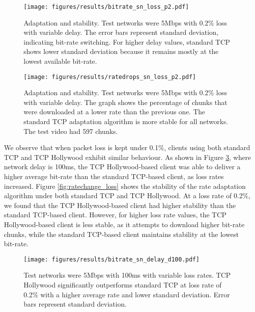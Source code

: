 \begin{figure}
  \centering
  \texttt{[image: figures/results/bitrate\_sn\_loss\_p2.pdf]}
  \caption{Adaptation and stability. Test networks were 5Mbps with 0.2\% loss with variable 
           delay. The error bars represent standard deviation, indicating bit-rate switching. For higher delay values, 
           standard TCP shows lower standard deviation because it remains mostly at the 
           lowest available bit-rate. }
  \label{fig:rate_delay2}
\end{figure}

\begin{figure}
  \centering
  \texttt{[image: figures/results/ratedrops\_sn\_loss\_p2.pdf]}
  \caption{Adaptation and stability. Test networks were 5Mbps with 0.2\% loss with variable 
           delay. The graph shows the percentage of chunks that were downloaded at a lower 
           rate than the previous one. The standard TCP adaptation algorithm is more stable 
           for all networks. The test video had 597 chunks.}
  \label{fig:ratechange_delay2}
\end{figure}

We observe that when packet loss is kept under 0.1\%, clients using both standard TCP and TCP 
Hollywood exhibit similar behaviour. As shown in Figure \ref{fig:rate_loss}, where network delay is 100ms, 
the TCP Hollywood-based client was able to deliver a higher average bit-rate than the standard TCP-based client, as
loss rates increased. Figure \ref{fig:ratechange_loss} shows the stability of the rate adaptation
algorithm under both standard TCP and TCP Hollywood. At a loss rate of 0.2\%, we found that the
TCP Hollywood-based client had higher stability than the standard TCP-based client. However,
for higher loss rate values, the TCP Hollywood-based client is less stable, as it attempts
to download higher bit-rate chunks, while the standard TCP-based client maintains stability
at the lowest bit-rate.

\begin{figure}
  \centering
  \texttt{[image: figures/results/bitrate\_sn\_delay\_d100.pdf]}
  \caption{Test networks were 5Mbps with 100ms with variable loss rates. TCP Hollywood 
           significantly outperforms standard TCP at loss rate of 0.2\% with a higher 
           average rate and lower standard deviation. Error bars represent standard deviation.}
  \label{fig:rate_loss}
\end{figure}

